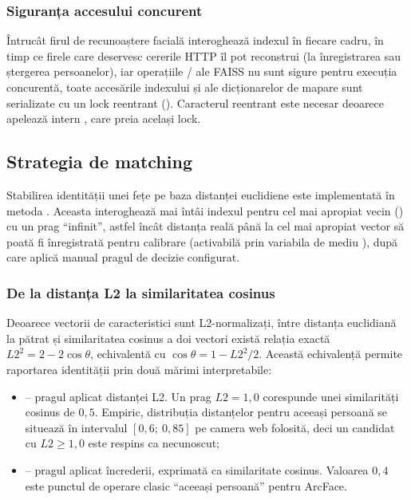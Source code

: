 \documentclass[../../main.tex]{subfiles}
\begin{document}
\subsubsection{Siguranța accesului concurent}
Întrucât firul de recunoaștere facială interoghează indexul în fiecare cadru, în
timp ce firele care deservesc cererile HTTP îl pot reconstrui (la înregistrarea sau
ștergerea persoanelor), iar operațiile / ale FAISS
nu sunt sigure pentru execuția concurentă, toate accesările indexului și ale
dicționarelor de mapare sunt serializate cu un lock reentrant
(). Caracterul reentrant este necesar deoarece
 apelează intern  \linebreak {}, care preia același lock.

\subsection{Strategia de matching}
\label{subsec:matching}

Stabilirea identității unei fețe pe baza distanței euclidiene este implementată în
metoda . Aceasta interoghează mai întâi indexul
pentru cel mai apropiat vecin () cu un prag ``infinit'', astfel încât
distanța reală până la cel mai apropiat vector să poată fi înregistrată pentru
calibrare (activabilă prin variabila de mediu ), după care aplică
manual pragul de decizie configurat.

\subsubsection{De la distanța L2 la similaritatea cosinus}
Deoarece vectorii de caracteristici sunt L2-normalizați, între distanța euclidiană la pătrat și
similaritatea cosinus a doi vectori există relația exactă
$L2^2 = 2 - 2\cos\theta$, echivalentă cu $\cos\theta = 1 - L2^2/2$. Această echivalență
permite raportarea identității prin două mărimi interpretabile:

\begin{itemize}
    \item {} -- pragul aplicat distanței L2.
    Un prag $L2 = 1{,}0$ corespunde unei similarități cosinus de $0{,}5$. Empiric,
    distribuția distanțelor pentru aceeași persoană se situează în intervalul
    $[0{,}6;\ 0{,}85]$ pe camera web folosită, deci un candidat cu $L2 \geq 1{,}0$
    este respins ca necunoscut;
    \item {} -- pragul aplicat încrederii, exprimată
    ca similaritate cosinus. Valoarea $0{,}4$ este punctul de operare clasic
    ``aceeași persoană'' pentru ArcFace.
\end{itemize}
\end{document}
